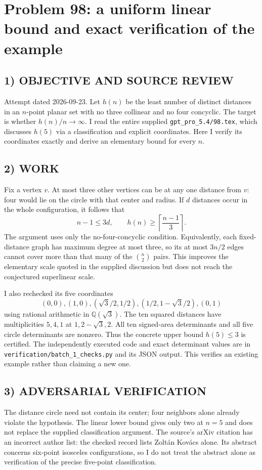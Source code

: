 \section{Problem 98: a uniform linear bound and exact verification of the example}
\subsection*{1) OBJECTIVE AND SOURCE REVIEW}
Attempt dated 2026-09-23. Let $h(n)$ be the least number of distinct distances in an $n$-point planar set with no three collinear and no four concyclic. The target is whether $h(n)/n\to\infty$. I read the entire supplied \texttt{gpt\_pro\_5.4/98.tex}, which discusses $h(5)$ via a classification and explicit coordinates. Here I verify its coordinates exactly and derive an elementary bound for every $n$.
\subsection*{2) WORK}
Fix a vertex $v$. At most three other vertices can be at any one distance from $v$: four would lie on the circle with that center and radius. If $d$ distances occur in the whole configuration, it follows that
\[
n-1\le3d,\qquad h(n)\ge\left\lceil\frac{n-1}{3}\right\rceil.
\]
The argument uses only the no-four-concyclic condition. Equivalently, each fixed-distance graph has maximum degree at most three, so its at most $3n/2$ edges cannot cover more than that many of the $\binom n2$ pairs. This improves the elementary scale quoted in the supplied discussion but does not reach the conjectured superlinear scale.

I also rechecked its five coordinates
\[
(0,0),(1,0),(\sqrt3/2,1/2),(1/2,1-\sqrt3/2),(0,1)
\]
using rational arithmetic in $\mathbb Q(\sqrt3)$. The ten squared distances have multiplicities $5,4,1$ at $1,2-\sqrt3,2$. All ten signed-area determinants and all five circle determinants are nonzero. Thus the concrete upper bound $h(5)\le3$ is certified. The independently executed code and exact determinant values are in \texttt{verification/batch\_1\_checks.py} and its JSON output. This verifies an existing example rather than claiming a new one.
\subsection*{3) ADVERSARIAL VERIFICATION}
The distance circle need not contain its center; four neighbors alone already violate the hypothesis. The linear lower bound gives only two at $n=5$ and does not replace the supplied classification argument. The source's arXiv citation has an incorrect author list: the checked record lists Zolt\'an Kov\'acs alone. Its abstract concerns six-point isosceles configurations, so I do not treat the abstract alone as verification of the precise five-point classification.
